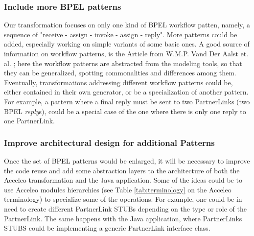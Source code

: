 \subsubsection{Include more BPEL patterns}
\label{sec:FutMorePatterns}
Our transformation focuses on only one kind of BPEL workflow patten, namely, a sequence of "receive - assign - invoke - assign - reply". More patterns could be added, especially working on simple variants of some basic ones. A good source of information on workflow patterns, is the Article from W.M.P. Vand Der Aalst et. al. \cite{AalstHKB03}; here the workflow patterns are abstracted from the modeling tools, so that they can be generalized, spotting commonalities and differences among them.
Eventually, transformations addressing different workflow patterns could be, either contained in their own generator, or be a specialization of another pattern. For example, a pattern where a final reply must be sent to two PartnerLinks (two BPEL \textit{reply}s), could be a special case of the one where there is only one reply to one PartnerLink.    

\subsubsection{Improve architectural design for additional Patterns}
\label{sec:FutImproveArchitectDesign}
Once the set of BPEL patterns would be enlarged, it will be necessary to improve the code reuse and add some abstraction layers to the architecture of both the Acceleo transformation and the Java application. Some of the ideas could be to use Acceleo modules hierarchies (see Table \ref{tab:terminology} on the Acceleo terminology) to specialize some of the operations. For example, one could be in need to create different PartnerLink STUBs depending on the type or role of the PartnerLink. The same happens with the Java application, where PartnerLinks STUBS could be implementing a generic PartnerLink interface class. 

